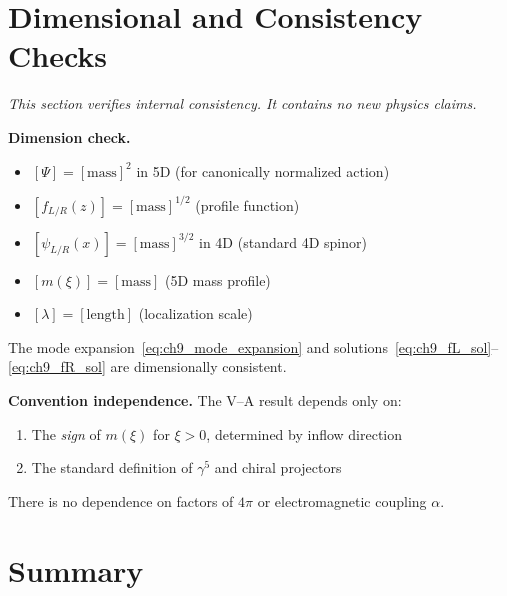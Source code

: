 \section{Dimensional and Consistency Checks}
\label{sec:ch9_consistency}

\begin{tcolorbox}[colback=gray!5!white, colframe=gray!60!black,
    title=\textbf{Consistency Check (Not a Derivation)}]
\emph{This section verifies internal consistency. It contains no new physics claims.}

\medskip
\textbf{Dimension check.}
\begin{itemize}[nosep]
    \item $[\Psi] = [\text{mass}]^2$ in 5D (for canonically normalized action)
    \item $[f_{L/R}(z)] = [\text{mass}]^{1/2}$ (profile function)
    \item $[\psi_{L/R}(x)] = [\text{mass}]^{3/2}$ in 4D (standard 4D spinor)
    \item $[m(\xi)] = [\text{mass}]$ (5D mass profile)
    \item $[\lambda] = [\text{length}]$ (localization scale)
\end{itemize}
The mode expansion~\eqref{eq:ch9_mode_expansion} and solutions~\eqref{eq:ch9_fL_sol}--\eqref{eq:ch9_fR_sol} are dimensionally consistent.

\medskip
\textbf{Convention independence.}
The V–A result depends only on:
\begin{enumerate}[nosep]
    \item The \emph{sign} of $m(\xi)$ for $\xi > 0$, determined by inflow direction
    \item The standard definition of $\gamma^5$ and chiral projectors
\end{enumerate}
There is no dependence on factors of $4\pi$ or electromagnetic coupling $\alpha$.
\end{tcolorbox}

\section{Summary}
\label{sec:ch9_summary}


